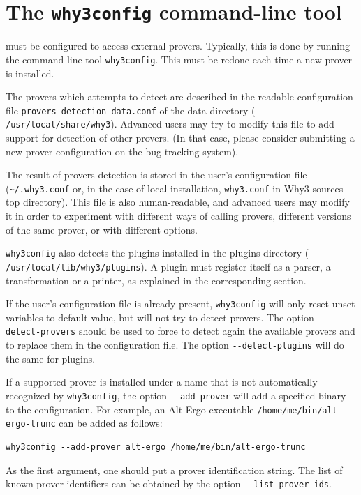\section{The \texttt{why3config} command-line tool}
\label{sec:why3config}

\why must be configured to access external provers. Typically, this is done
by running
the command line tool \texttt{why3config}.
This must be redone each time a new prover is installed.

The provers which \why attempts to detect are described in
the readable configuration file \texttt{provers-detection-data.conf}
of the \why data directory (\eg{}
\texttt{/usr/local/share/why3}). Advanced users may try to modify this
file to add support for detection of other provers. (In that case,
please consider submitting a new prover configuration on the bug
tracking system).

The result of provers detection is stored in the user's
configuration file (\verb+~/.why3.conf+ or, in the case of local
installation, \verb+why3.conf+ in Why3 sources top directory). This file
is also human-readable, and advanced users may modify it in order to
experiment with different ways of calling provers, \eg{} different
versions of the same prover, or with different options.

\texttt{why3config} also detects the plugins installed in the \why
plugins directory (\eg{} \texttt{/usr/local/lib/why3/plugins}). A
plugin must register itself as a parser, a transformation or a
printer, as explained in the corresponding section.

If the user's configuration file is already present,
\texttt{why3config} will only reset unset variables to default value,
but will not try to detect provers.
The option \verb|--detect-provers| should be used to force
\why to detect again the available
provers and to replace them in the configuration file. The option
\verb|--detect-plugins| will do the same for plugins.

If a supported prover is installed under a name
that is not automatically recognized by \texttt{why3config},
the option \verb|--add-prover| will add a specified binary
to the configuration. For example, an Alt-Ergo executable
\verb|/home/me/bin/alt-ergo-trunc| can be added as follows:
\begin{verbatim}
why3config --add-prover alt-ergo /home/me/bin/alt-ergo-trunc
\end{verbatim}
As the first argument, one should put a prover
identification string. The list of known prover identifiers
can be obtained by the option \verb|--list-prover-ids|.

